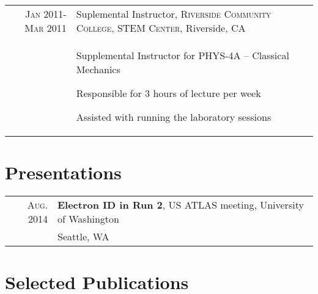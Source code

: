 \documentclass[a4paper,10pt]{article} %
\begin{document}
\begin{longtable}{r|p{11cm}}

\textsc{Jan 2011-Mar 2011} & Suplemental Instructor, \textsc{Riverside Community College, STEM Center}, Riverside, CA \emph{}\\
		& \begin{itemize}
			\footnotesize{
				\item Supplemental Instructor for PHYS-4A – Classical Mechanics
				\item Responsible for 3 hours of lecture per week
   				\item Assisted with running the laboratory sessions
			}
          \end{itemize} \\
\end{longtable}


\section{Presentations}

\begin{tabular}{rl}
\textsc{Aug.} 2014  & \textbf{Electron ID in Run 2}, US ATLAS meeting, University of Washington \\
                    &  Seattle, WA \\
\end{tabular}



\section{Selected Publications}
\end{document}
